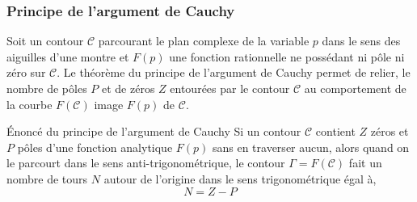 \subsubsection{Principe de l'argument de Cauchy}
Soit un contour $\mathcal{C}$ parcourant le plan complexe de 
la variable $p$ dans le sens des aiguilles d'une montre et $F(p)$ une fonction 
rationnelle ne possédant ni pôle ni zéro sur $\mathcal{C}$. Le théorème du 
principe de l'argument de Cauchy permet de relier, le nombre de pôles $P$ et 
de zéros $Z$ entourées par le contour $\mathcal{C}$ au comportement de la 
courbe $F(\mathcal{C})$ image $F(p)$ de $\mathcal{C}$.

\begin{theorem}{\'Enoncé du principe de l'argument de Cauchy
    } 
    Si un contour $\mathcal{C}$ contient $Z$ zéros et $P$ pôles d'une fonction 
    analytique $F(p)$ sans en traverser aucun, alors quand on le parcourt dans 
    le sens anti-trigonométrique, le contour $\Gamma=F(\mathcal{C})$ fait un 
    nombre de tours $N$ autour de l'origine dans le sens trigonométrique égal 
    à,
    \[ 
        N=Z-P
    \]
\end{theorem}

